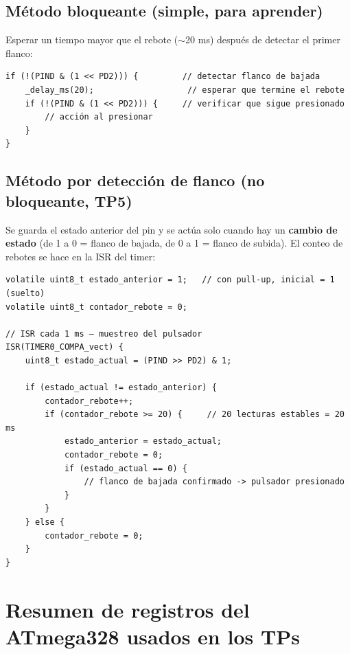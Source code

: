 \subsection{Método bloqueante (simple, para aprender)}

Esperar un tiempo mayor que el rebote ($\sim$20 ms) después de detectar el primer
flanco:

\begin{lstlisting}[style=estilo-c]
if (!(PIND & (1 << PD2))) {         // detectar flanco de bajada
    _delay_ms(20);                   // esperar que termine el rebote
    if (!(PIND & (1 << PD2))) {     // verificar que sigue presionado
        // acción al presionar
    }
}
\end{lstlisting}

\subsection{Método por detección de flanco (no bloqueante, TP5)}

Se guarda el estado anterior del pin y se actúa solo cuando hay un \textbf{cambio de
estado} (de 1 a 0 = flanco de bajada, de 0 a 1 = flanco de subida). El conteo de
rebotes se hace en la ISR del timer:

\begin{lstlisting}[style=estilo-c]
volatile uint8_t estado_anterior = 1;   // con pull-up, inicial = 1 (suelto)
volatile uint8_t contador_rebote = 0;

// ISR cada 1 ms — muestreo del pulsador
ISR(TIMER0_COMPA_vect) {
    uint8_t estado_actual = (PIND >> PD2) & 1;

    if (estado_actual != estado_anterior) {
        contador_rebote++;
        if (contador_rebote >= 20) {     // 20 lecturas estables = 20 ms
            estado_anterior = estado_actual;
            contador_rebote = 0;
            if (estado_actual == 0) {
                // flanco de bajada confirmado -> pulsador presionado
            }
        }
    } else {
        contador_rebote = 0;
    }
}
\end{lstlisting}

\section{Resumen de registros del ATmega328 usados en los TPs}

